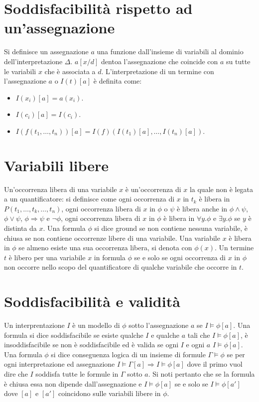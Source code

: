 \section{Soddisfacibilit\`a rispetto ad un'assegnazione}
Si definisce un assegnazione $a$ una funzione dall'insieme di variabili al dominio dell'interpretazione $\Delta$. $a[x/d]$ dentoa l'assegnazione che coincide con $a$ su tutte le variabili $x$ che \`e associata a 
$d$. L'interpretazione di un termine con l'assegnazione $a$ o $I(t)[a]$ \`e definita come: 
\begin{itemize}
\item $I(x_i)[a]=a(x_i)$.
\item $I(c_i)[a]=I(c_i)$.
\item $I(f(t_1, \dots, t_n))[a]=I(f)(I(t_1)[a], \dots, I(t_n)[a])$.
\end{itemize}
\section{Variabili libere}
Un'occorrenza libera di una variabile $x$ \`e un'occorrenza di $x$ la quale non \`e legata  a un quantificatore: si definisce come ogni occorrenza di $x$ in $t_k$ \`e libera in $P(t_1, \dots, t_k, \dots, t_n)$, ogni
occorrenza libera di $x$ in $\phi$ o $\psi$ \`e libera anche in $\phi\land\psi$, $\phi\lor\psi$, $\phi\Rightarrow\psi$ e $\neg\phi$, ogni occorrenza libera di $x$ in $\phi$ \`e libera in $\forall y.\phi$ e $\exists y.
\phi$ se $y$ \`e distinta da $x$. Una formula $\phi$ si dice ground se non contiene nessuna variabile, \`e chiusa se non contiene occorrenze libere di una variabile. Una variabile $x$ \`e libera in $\phi$ se almeno
esiste una sua occorrenza libera, si denota con $\phi(x)$. Un termine $t$ \`e libero per una variabile $x$ in formula $\phi$ se e solo se ogni occorrenza di $x$ in $\phi$ non occorre nello scopo del quantificatore
di qualche variabile che occorre in $t$. 
\section{Soddisfacibilit\`a e validit\`a}
Un interprentazione $I$ \`e un modello di $\phi$ sotto l'assegnazione $a$ se $I\models\phi[a]$. Una formula si dice soddisfacibile se esiste qualche $I$ e qualche $a$ tali che $I\models\phi[a]$, \`e 
insoddisfacibile se non \`e soddisfacibile ed \`e valida se ogni $I$ e ogni $a$ $I\models\phi[a]$. Una formula $\phi$ si dice conseguenza logica di un insieme di formule $\Gamma\models\phi$ se per ogni
interpretazione ed assegnazione $I\models\Gamma[a]\Rightarrow I\models\phi[a]$ dove il primo vuol dire che $I$ soddisfa tutte le formule in $\Gamma$ sotto $a$. Si noti pertanto che se la formula \`e
chiusa essa non dipende dall'assegnazione e $I\models\phi[a]$ se e solo se $I\models\phi[a']$ dove $[a]$ e $[a']$ coincidono sulle variabili libere in $\phi$. 
